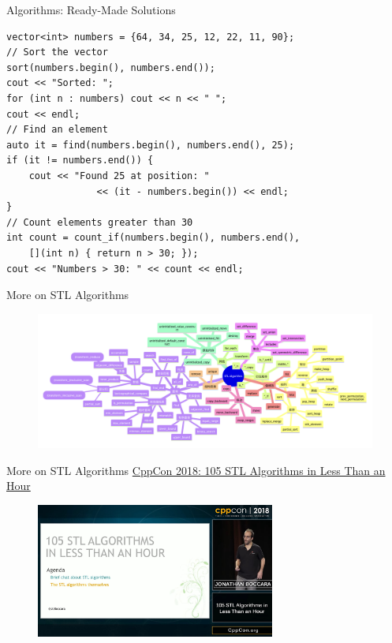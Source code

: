 \begin{frame}[fragile]{ Algorithms: Ready-Made Solutions}
    \begin{verbatim}
vector<int> numbers = {64, 34, 25, 12, 22, 11, 90};
// Sort the vector
sort(numbers.begin(), numbers.end());
cout << "Sorted: ";
for (int n : numbers) cout << n << " ";
cout << endl;
// Find an element
auto it = find(numbers.begin(), numbers.end(), 25);
if (it != numbers.end()) {
    cout << "Found 25 at position: "
                << (it - numbers.begin()) << endl;
}
// Count elements greater than 30
int count = count_if(numbers.begin(), numbers.end(),
    [](int n) { return n > 30; });
cout << "Numbers > 30: " << count << endl;
    \end{verbatim}
\end{frame}

\begin{frame}[fragile]{ More on STL Algorithms}
    \begin{figure}
        \includegraphics[width=\textwidth]{day8_pm/img/2-algorithms}
    \end{figure}
\end{frame}

\begin{frame}[fragile]{ More on STL Algorithms}
    \textcolor{blue}{\href{https://www.youtube.com/watch?v=2olsGf6JIkU&ab_channel=CppCon}{CppCon 2018: 105 STL Algorithms in Less Than an Hour}}
    \begin{figure}
        \includegraphics[width=0.7\textwidth]{day8_pm/img/2-cppcon2018}
    \end{figure}
\end{frame}

